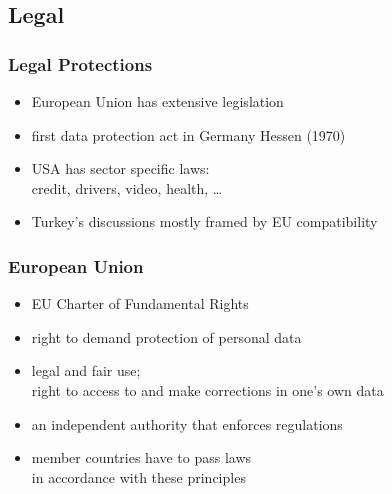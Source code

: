 \documentclass[dvipsnames]{beamer}
\theoremstyle{plain}
\begin{document}
\subsection{Legal}

\begin{frame}
  \frametitle{Legal Protections}

  \begin{itemize}
    \item European Union has extensive legislation
    \item first data protection act in Germany Hessen (1970)

    \medskip
    \item USA has sector specific laws:\\
      credit, drivers, video, health, \ldots

    \medskip
    \item Turkey's discussions mostly framed by EU compatibility
  \end{itemize}
\end{frame}

\begin{frame}
  \frametitle{European Union}

  \begin{itemize}
    \item EU Charter of Fundamental Rights

    \smallskip
    \item right to demand protection of personal data
    \item legal and fair use;\\
      right to access to and make corrections in one's own data
    \item an independent authority that enforces regulations

    \bigskip
    \item member countries have to pass laws\\
      in accordance with these principles
  \end{itemize}
\end{frame}
\end{document}
